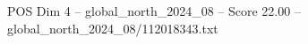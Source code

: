 \begin{textsample}{POS Dim 4 – global\_north\_2024\_08 – Score 22.00 – global\_north\_2024\_08/112018343.txt}
\end{textsample}
